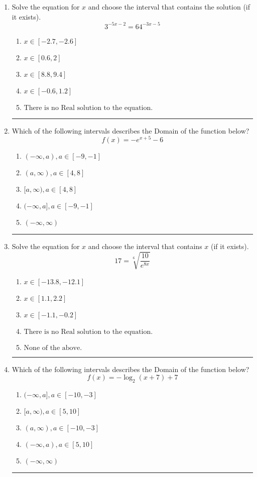 \documentclass[14pt]{extbook}
\newcommand{\litem}[1]{\item#1\hspace*{-1cm}\rule{\textwidth}{0.4pt}}
\begin{document}
\begin{enumerate}
\litem{
Solve the equation for $x$ and choose the interval that contains the solution (if it exists).\[ 3^{-5x-2} = 64^{-3x-5} \]\begin{enumerate}[label=\Alph*.]
\item \( x \in [-2.7, -2.6] \)
\item \( x \in [0.6, 2] \)
\item \( x \in [8.8, 9.4] \)
\item \( x \in [-0.6, 1.2] \)
\item \( \text{There is no Real solution to the equation.} \)

\end{enumerate} }
\litem{
Which of the following intervals describes the Domain of the function below?\[ f(x) = -e^{x+5}-6 \]\begin{enumerate}[label=\Alph*.]
\item \( (-\infty, a), a \in [-9, -1] \)
\item \( (a, \infty), a \in [4, 8] \)
\item \( [a, \infty), a \in [4, 8] \)
\item \( (-\infty, a], a \in [-9, -1] \)
\item \( (-\infty, \infty) \)

\end{enumerate} }
\litem{
 Solve the equation for $x$ and choose the interval that contains $x$ (if it exists).\[  17 = \sqrt[6]{\frac{10}{e^{8x}}} \]\begin{enumerate}[label=\Alph*.]
\item \( x \in [-13.8, -12.1] \)
\item \( x \in [1.1, 2.2] \)
\item \( x \in [-1.1, -0.2] \)
\item \( \text{There is no Real solution to the equation.} \)
\item \( \text{None of the above.} \)

\end{enumerate} }
\litem{
Which of the following intervals describes the Domain of the function below?\[ f(x) = -\log_2{(x+7)}+7 \]\begin{enumerate}[label=\Alph*.]
\item \( (-\infty, a], a \in [-10, -3] \)
\item \( [a, \infty), a \in [5, 10] \)
\item \( (a, \infty), a \in [-10, -3] \)
\item \( (-\infty, a), a \in [5, 10] \)
\item \( (-\infty, \infty) \)


\end{enumerate}}
\end{enumerate}
\end{document}
